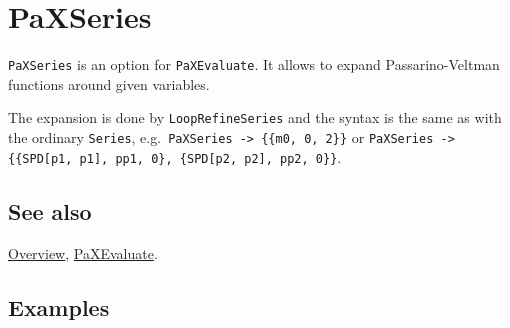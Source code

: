 \documentclass[../FeynHelpersManual.tex]{subfiles}
\begin{document}
\hypertarget{paxseries}{
\section{PaXSeries}\label{paxseries}}

\texttt{PaXSeries} is an option for \texttt{PaXEvaluate}. It allows to
expand Passarino-Veltman functions around given variables.

The expansion is done by \texttt{LoopRefineSeries} and the syntax is the
same as with the ordinary \texttt{Series},
e.g.~\texttt{PaXSeries -> \{\allowbreak{}\{\allowbreak{}m0,\ \allowbreak{}0,\ \allowbreak{}2\}\}}
or
\texttt{PaXSeries -> \{\allowbreak{}\{\allowbreak{}SPD[\allowbreak{}p1,\ \allowbreak{}p1],\ \allowbreak{}pp1,\ \allowbreak{}0\},\ \allowbreak{}\{\allowbreak{}SPD[\allowbreak{}p2,\ \allowbreak{}p2],\ \allowbreak{}pp2,\ \allowbreak{}0\}\}}.

\subsection{See also}

\hyperlink{toc}{Overview}, \hyperlink{paxevaluate}{PaXEvaluate}.

\subsection{Examples}
\end{document}
